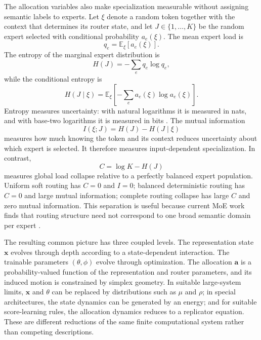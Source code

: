 \documentclass[11pt]{article}
\begin{document}
The allocation variables also make specialization measurable without assigning semantic labels to experts. Let $\xi$ denote a random token together with the context that determines its router state, and let $J\in\{1,\ldots,K\}$ be the random expert selected with conditional probability $a_e(\xi)$. The mean expert load is
\begin{equation}
q_e
=
\mathbb E_\xi[a_e(\xi)].
\end{equation}
The entropy of the marginal expert distribution is
\begin{equation}
H(J)
=
-
\sum_e q_e\log q_e,
\end{equation}
while the conditional entropy is
\begin{equation}
H(J\mid\xi)
=
\mathbb E_\xi
\left[
-
\sum_e a_e(\xi)\log a_e(\xi)
\right].
\end{equation}
Entropy measures uncertainty: with natural logarithms it is measured in nats, and with base-two logarithms it is measured in bits \cite{shannon1948}. The mutual information
\begin{equation}
I(\xi;J)
=
H(J)-H(J\mid\xi)
\label{eq:mutual-information}
\end{equation}
measures how much knowing the token and its context reduces uncertainty about which expert is selected. It therefore measures input-dependent specialization. In contrast,
\begin{equation}
C
=
\log K-H(J)
\end{equation}
measures global load collapse relative to a perfectly balanced expert population. Uniform soft routing has $C=0$ and $I=0$; balanced deterministic routing has $C=0$ and large mutual information; complete routing collapse has large $C$ and zero mutual information. This separation is useful because current MoE work finds that routing structure need not correspond to one broad semantic domain per expert \cite{wang2026,lasy2026}.

The resulting common picture has three coupled levels. The representation state $\mathbf x$ evolves through depth according to a state-dependent interaction. The trainable parameters $(\theta,\phi)$ evolve through optimization. The allocation $\mathbf a$ is a probability-valued function of the representation and router parameters, and its induced motion is constrained by simplex geometry. In suitable large-system limits, $\mathbf x$ and $\theta$ can be replaced by distributions such as $\mu$ and $\rho$; in special architectures, the state dynamics can be generated by an energy; and for suitable score-learning rules, the allocation dynamics reduces to a replicator equation. These are different reductions of the same finite computational system rather than competing descriptions.
\end{document}
